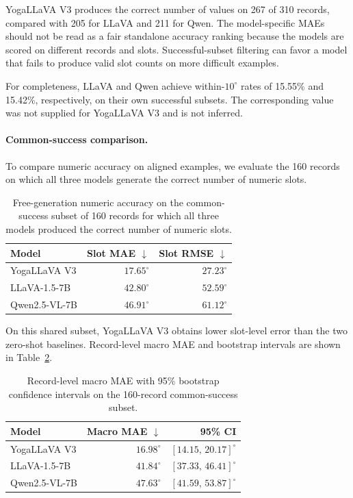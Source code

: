 YogaLLaVA V3 produces the correct number of values on 267 of 310
records, compared with 205 for LLaVA and 211 for Qwen. The
model-specific MAEs should not be read as a fair standalone accuracy
ranking because the models are scored on different records and slots.
Successful-subset filtering can favor a model that fails to produce
valid slot counts on more difficult examples.

For completeness, LLaVA and Qwen achieve within-$10^\circ$ rates of
15.55\% and 15.42\%, respectively, on their own successful subsets.
The corresponding value was not supplied for YogaLLaVA V3 and is not
inferred.

\paragraph{Common-success comparison.}
To compare numeric accuracy on aligned examples, we evaluate the 160
records on which all three models generate the correct number of
numeric slots.

\begin{table}[t]
    \centering
    \caption{Free-generation numeric accuracy on the common-success
    subset of 160 records for which all three models produced the
    correct number of numeric slots.}
    \label{tab:common_success}
    \begin{tabular}{lrr}
        \toprule
        \textbf{Model} &
        \textbf{Slot MAE $\downarrow$} &
        \textbf{Slot RMSE $\downarrow$} \\
        \midrule
        YogaLLaVA V3 & $17.65^\circ$ & $27.23^\circ$ \\
        LLaVA-1.5-7B & $42.80^\circ$ & $52.59^\circ$ \\
        Qwen2.5-VL-7B & $46.91^\circ$ & $61.12^\circ$ \\
        \bottomrule
    \end{tabular}
\end{table}

On this shared subset, YogaLLaVA V3 obtains lower slot-level error than
the two zero-shot baselines. Record-level macro MAE and bootstrap
intervals are shown in Table~\ref{tab:bootstrap_results}.

\begin{table}[t]
    \centering
    \caption{Record-level macro MAE with 95\% bootstrap confidence
    intervals on the 160-record common-success subset.}
    \label{tab:bootstrap_results}
    \begin{tabular}{lrr}
        \toprule
        \textbf{Model} &
        \textbf{Macro MAE $\downarrow$} &
        \textbf{95\% CI} \\
        \midrule
        YogaLLaVA V3 & $16.98^\circ$ & $[14.15,\,20.17]^\circ$ \\
        LLaVA-1.5-7B & $41.84^\circ$ & $[37.33,\,46.41]^\circ$ \\
        Qwen2.5-VL-7B & $47.63^\circ$ & $[41.59,\,53.87]^\circ$ \\
        \bottomrule
    \end{tabular}
\end{table}

